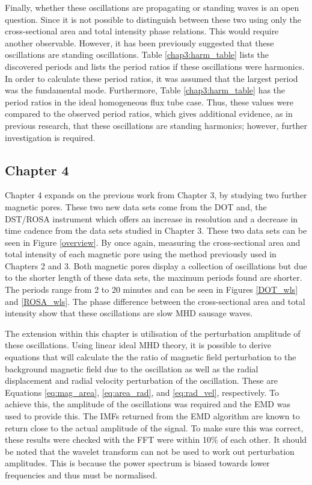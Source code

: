     Finally, whether these oscillations are propagating or standing waves is an open question.
    Since it is not possible to distinguish between these two using only the cross-sectional area and total intensity phase relations.
    This would require another observable.
    However, it has been previously suggested that these oscillations are standing oscillations.
    Table \ref{chap3:harm_table} lists the discovered periods and lists the period ratios if these oscillations were harmonics.
    In order to calculate these period ratios, it was assumed that the largest period was the fundamental mode. 
    Furthermore, Table \ref{chap3:harm_table} has the period ratios in the ideal homogeneous flux tube case.       
    Thus, these values were compared to the observed period ratios, which gives additional evidence, as in previous research, that these oscillations are standing harmonics; however, further investigation is required.
    
    \subsection{Chapter 4}
    	
    Chapter 4 expands on the previous work from Chapter 3, by studying two further magnetic pores.
    These two new data sets come from the DOT and, the DST/ROSA instrument which offers an increase in resolution and a decrease in time cadence from the data sets studied in Chapter 3.
    These two data sets can be seen in Figure \ref{overview}.
    By once again, measuring the cross-sectional area and total intensity of each magnetic pore using the method previously used in Chapters 2 and 3. 
    Both magnetic pores display a collection of oscillations but due to the shorter length of these data sets, the maximum periods found are shorter.
    The periods range from 2 to 20 minutes and can be seen in Figures \ref{DOT_wls} and \ref{ROSA_wls}.     
    The phase difference between the cross-sectional area and total intensity show that these oscillations are slow MHD sausage waves.
    
    The extension within this chapter is utilisation of the perturbation amplitude of these oscillations.
    Using linear ideal MHD theory, it is possible to derive equations that will calculate the the ratio of magnetic field perturbation to the background magnetic field due to the oscillation as well as the radial displacement and radial velocity perturbation of the oscillation.
    These are Equations \ref{eq:mag_area}, \ref{eq:area_rad}, and \ref{eq:rad_vel}, respectively. 
    To achieve this, the amplitude of the oscillations was required and the EMD was used to provide this.
    The IMFs returned from the EMD algorithm are known to return close to the actual amplitude of the signal.
    To make sure this was correct, these results were checked with the FFT were within 10\% of each other.
	It should be noted that the wavelet transform can not be used to work out perturbation amplitudes.
	This is because the power spectrum is biased towards lower frequencies and thus must be normalised.
  
